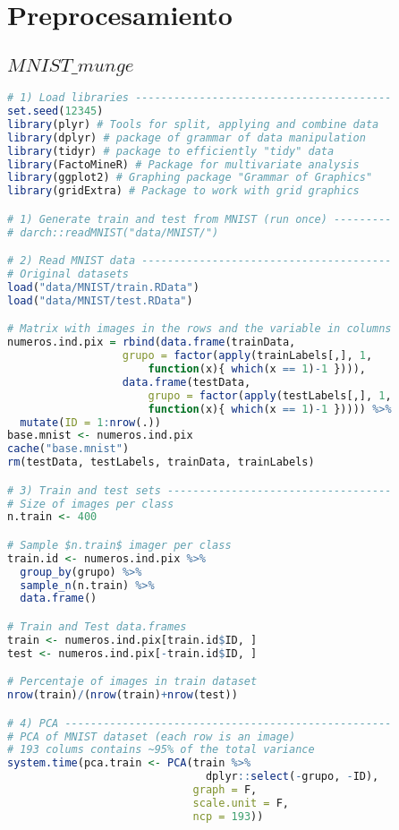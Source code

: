 \section{Preprocesamiento}

\subsection{$MNIST\_munge$}
\begin{lstlisting}[language=R, basicstyle=\small]
# 1) Load libraries ----------------------------------------
set.seed(12345)
library(plyr) # Tools for split, applying and combine data
library(dplyr) # package of grammar of data manipulation
library(tidyr) # package to efficiently "tidy" data
library(FactoMineR) # Package for multivariate analysis
library(ggplot2) # Graphing package "Grammar of Graphics"
library(gridExtra) # Package to work with grid graphics

# 1) Generate train and test from MNIST (run once) ---------
# darch::readMNIST("data/MNIST/")

# 2) Read MNIST data ---------------------------------------
# Original datasets
load("data/MNIST/train.RData")
load("data/MNIST/test.RData")

# Matrix with images in the rows and the variable in columns
numeros.ind.pix = rbind(data.frame(trainData, 
                  grupo = factor(apply(trainLabels[,], 1,  
                      function(x){ which(x == 1)-1 }))),
                  data.frame(testData, 
                      grupo = factor(apply(testLabels[,], 1,  
                      function(x){ which(x == 1)-1 })))) %>% 
  mutate(ID = 1:nrow(.))
base.mnist <- numeros.ind.pix
cache("base.mnist")
rm(testData, testLabels, trainData, trainLabels)

# 3) Train and test sets -----------------------------------
# Size of images per class
n.train <- 400

# Sample $n.train$ imager per class
train.id <- numeros.ind.pix %>% 
  group_by(grupo) %>% 
  sample_n(n.train) %>% 
  data.frame()

# Train and Test data.frames                    
train <- numeros.ind.pix[train.id$ID, ]
test <- numeros.ind.pix[-train.id$ID, ]

# Percentaje of images in train dataset
nrow(train)/(nrow(train)+nrow(test))

# 4) PCA ---------------------------------------------------
# PCA of MNIST dataset (each row is an image)
# 193 colums contains ~95% of the total variance
system.time(pca.train <- PCA(train %>% 
                               dplyr::select(-grupo, -ID), 
                             graph = F,
                             scale.unit = F,
                             ncp = 193))


\end{lstlisting}
